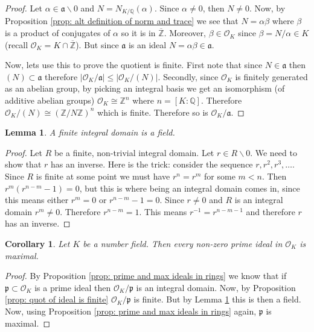 \documentclass[11pt,a4paper]{report}
\theoremstyle{plain}
\newtheorem{lemma}[subsection]{Lemma}
\newtheorem{corollary}[subsection]{Corollary}
\theoremstyle{definition}
\theoremstyle{definition}
\newcommand{\ZZ}{\mathbb{Z}}
\def\QQ{\mathbb{Q}}
\def \Nm {N_{K/\QQ}}
\def\gothp{\mathfrak{p}}
\def \a{\alpha}
\def \OO {\mathcal{O}}
\def \ov{\overline}
\def\gotha{\mathfrak{a}}
\begin{document}
	\begin{proof}
		Let $\a \in \gotha \backslash 0$ and $N=\Nm(\a)$. Since $\a \neq 0$, then $N \neq 0$. Now, by Proposition \ref{prop: alt definition of norm and trace} we see that $N=\a \beta$ where $\beta$ is a product of conjugates of $\a$ so it is in $\ov{\ZZ}$. Moreover, $\beta \in \OO_K$ since $\beta=N/\a \in K$ (recall $\OO_K=K \cap \ov{\ZZ}$). But since $\gotha$ is an ideal $N=\a \beta \in \gotha$.
		
		Now, lets use this to prove the quotient is finite. First note that since $N \in \gotha$ then $(N) \subset \gotha$ therefore $|\OO_K /\gotha| \leq |\OO_K / (N)|$. Secondly, since $\OO_K$ is finitely generated as an abelian group, by picking an integral basis we get an isomorphism (of additive abelian groups) $\OO_K \cong \ZZ^n$ where $n=[K:\QQ]$. Therefore $\OO_K/(N) \cong (\ZZ/N\ZZ)^n$ which is finite. Therefore so is $\OO_K/\gotha$.
	\end{proof}
	
	
	
	\begin{lemma}\label{lem: fin int dom is field}
		A finite integral domain is a field.
	\end{lemma}
	
	
	\begin{proof}
		Let $R$ be a finite, non-trivial integral domain. Let $r \in R\backslash 0$. We need to show that $r$ has an inverse. Here is the trick: consider the sequence $r,r^2,r^3,\dots.$ Since $R$ is finite at some point we must have $r^n=r^m$ for some $m<n$. Then $r^m(r^{n-m}-1)=0$, but this is where being an integral domain comes in, since this means either $r^m=0$ or $r^{n-m}-1=0$. Since $r \neq 0$ and $R$ is an integral domain $r^m \neq 0$. Therefore $r^{n-m}=1$. This means $r^{-1}=r^{n-m-1}$ and therefore $r$ has an inverse.
	\end{proof}
	
	\begin{corollary}\label{cor: prim ideal is maximal}
		Let $K$ be a number field. Then every non-zero prime ideal in $\OO_K$ is maximal.
	\end{corollary}
	
	\begin{proof}
		By Proposition \ref{prop: prime and max ideals in rings} we know that if $\gothp \subset \OO_K$ is a prime ideal then $\OO_K/\gothp$ is an integral domain. Now, by Proposition \ref{prop: quot of ideal is finite} $\OO_K /\gothp$ is finite. But by Lemma \ref{lem: fin int dom is field} this is then a field. Now, using Proposition \ref{prop: prime and max ideals in rings} again, $\gothp$ is maximal.
	\end{proof}
	
\end{document}
